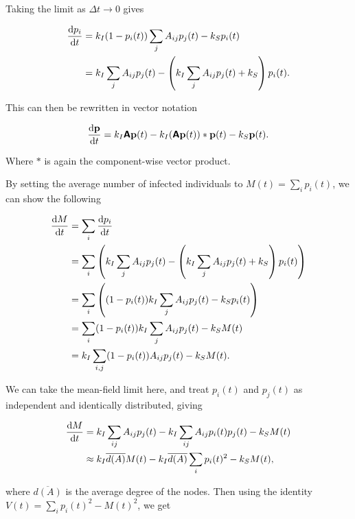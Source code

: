 \documentclass[12pt,a4paper,openany,twoside]{book}
\renewcommand{\v}[1]{\mathbf{#1}}      %
\newcommand{\m}[1]{\bm{\mathsf{#1}}}	 %
\renewcommand{\d}{{\mathrm d}}
\renewcommand{\bar}{\overline}
\newcommand{\fd}[2]{\mathchoice{\frac{\d #1}{\d #2}}{\d #1/\d #2}{\d #1/\d #2}{\d #1/\d #2}}
\begin{document}
Taking the limit as $\Delta t \rightarrow 0$ gives

\begin{equation}
\begin{aligned}
	\fd {p_i} {t} &= k_I (1 - p_i(t)) \sum_j A_{ij} p_j(t) - k_S p_i(t) \\
	&= k_I \sum_j A_{ij} p_j(t) - \left( k_I \sum_j A_{ij} p_j(t) + k_S \right) p_i(t). \label{indvCME}
\end{aligned}
\end{equation}

This can then be rewritten in vector notation

\begin{equation}
	\fd {\v{p}} {t} = k_I \m{A} \v{p}(t) - k_I (\m{A} \v{p}(t)) * \v{p}(t) - k_S \v{p}(t).
\end{equation}

Where $*$ is again the component-wise vector product.

By setting the average number of infected individuals to $M(t) = \sum_{i} p_i(t)$, we can show the following

\begin{equation}
\begin{aligned}
	\fd {M} {t} &= \sum_{i} \fd {p_i} {t} \\
	&= \sum_i \left( k_I \sum_j A_{ij} p_j(t) - \left( k_I \sum_j A_{ij} p_j(t) + k_S \right) p_i(t) \right) \\
	&= \sum_i \left( (1-p_i(t)) k_I \sum_j A_{ij} p_j(t) - k_S p_i(t) \right) \\
	&= \sum_i (1-p_i(t)) k_I \sum_j A_{ij} p_j(t) - k_S M(t) \\
	&= k_I \sum_{i, j} (1-p_i(t)) A_{ij} p_j(t) - k_S M(t).
\end{aligned}
\end{equation}

We can take the mean-field limit here, and treat $p_i(t)$ and $p_j(t)$ as independent and identically distributed, giving

\begin{equation}
\begin{aligned}
	\fd {M} {t} &= k_I \sum_{ij} A_{ij} p_j(t) - k_I \sum_{ij} A_{ij} p_i(t) p_j(t) - k_S M(t) \\
	&\approx k_I \bar{d(A)} M(t) - k_I \bar{d(A)} \sum_{i} p_i(t)^2 - k_S M(t), 
\end{aligned}
\end{equation}

where $\bar{d(A)}$ is the average degree of the nodes. Then using the identity $V(t) = \sum_{i} p_i(t)^2 - M(t)^2$, we get
\end{document}
